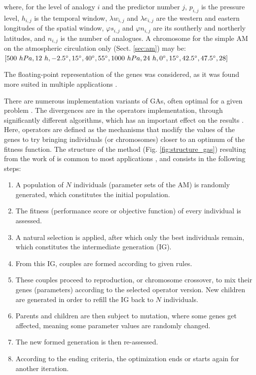 \documentclass{ametsoc}
\begin{document}
\begin{equation}
[p_{i,j}, h_{i,j}, \lambda w_{i,j}, \lambda e_{i,j}, \varphi s_{i,j}, \varphi n_{i,j}, p_{i,j+1}, h_{i,j+1}, ..., n_{i}, ... p_{i+1,j}, h_{i+1,j}, ..., n_{i+1}, ...]
\end{equation}
where, for the level of analogy $i$ and the predictor number $j$, $p_{i,j}$ is the pressure level, $h_{i,j}$ is the temporal window, $\lambda w_{i,j}$ and $\lambda e_{i,j}$ are the western and eastern longitudes of the spatial window, $\varphi s_{i,j}$ and $\varphi n_{i,j}$ are its southerly and northerly latitudes, and $n_{i,j}$ is the number of analogues. A chromosome for the simple AM on the atmospheric circulation only (Sect. \ref{sec:am}) may be: $[500~hPa, 12~h, -2.5\degree, 15\degree, 40\degree, 55\degree, 1000~hPa, 24~h, 0\degree, 15\degree, 42.5\degree, 47.5\degree, 28]$

The floating-point representation \citep[instead of the canonical binary, see][]{Goldberg1989, Goldberg1990a, Holland1992b} of the genes was considered, as it was found more suited in multiple applications \citep{Michalewicz1996, Herrera1998a, Haupt2004, Back1996b, Gaffney2010a}. 

There are numerous implementation variants of GAs, often optimal for a given problem \citep{Hart1991a, Schraudolph1992a}. The divergences are in the operators implementation, through significantly different algorithms, which has an important effect on the results \citep{Gaffney2010a}. Here, operators are defined as the mechanisms that modify the values of the genes to try bringing individuals (or chromosomes) closer to an optimum of the fitness function. The structure of the method (Fig. \ref{fig:structure_gas}) resulting from the work of \citet{Holland1992b} is common to most applications \citep{Back1993b}, and consists in the following steps:

\begin{enumerate}
	\item A population of $N$ individuals (parameter sets of the AM) is randomly generated, which constitutes the initial population.
	\item The fitness (performance score or objective function) of every individual is assessed.
	\item A natural selection is applied, after which only the best individuals remain, which constitutes the intermediate generation (IG).
	\item From this IG, couples are formed according to given rules.
	\item These couples proceed to reproduction, or chromosome crossover, to mix their genes (parameters) according to the selected operator version. New children are generated in order to refill the IG back to $N$ individuals.
	\item Parents and children are then subject to mutation, where some genes get affected, meaning some parameter values are randomly changed.
	\item The new formed generation is then re-assessed.
	\item According to the ending criteria, the optimization ends or starts again for another iteration.
\end{enumerate}
\end{document}
